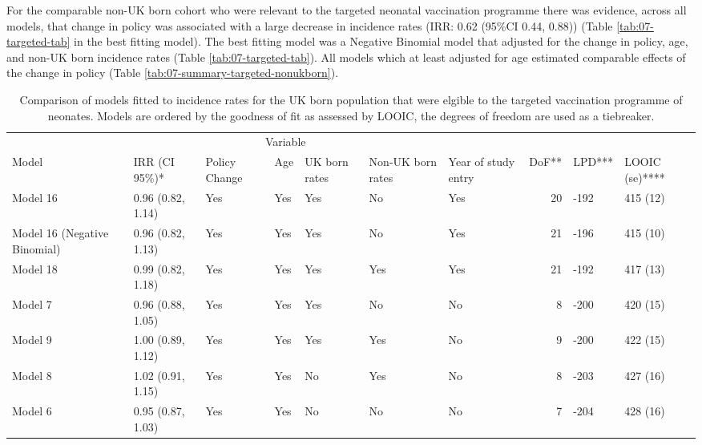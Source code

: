 \documentclass[11pt,twoside]{bristolthesis}
\begin{document}
  For the comparable non-UK born cohort who were relevant to the targeted neonatal vaccination programme there was evidence, across all models, that change in policy was associated with a large decrease in incidence rates (IRR: 0.62 (95\%CI 0.44, 0.88)) (Table \ref{tab:07-targeted-tab} in the best fitting model). The best fitting model was a Negative Binomial model that adjusted for the change in policy, age, and non-UK born incidence rates (Table \ref{tab:07-targeted-tab}). All models which at least adjusted for age estimated comparable effects of the change in policy (Table \ref{tab:07-summary-targeted-nonukborn}).
  \begin{landscape}\begin{table}[!h]
  
  \caption[Comparison of models fitted to incidence rates for the UK born population that were elgible to the targeted vaccination programme of neonates.]{\label{tab:07-summary-targeted-ukborn}Comparison of models fitted to incidence rates for the UK born population that were elgible to the targeted vaccination programme of neonates. Models are ordered by the goodness of fit as assessed by LOOIC, the degrees of freedom are used as a tiebreaker.}
  \centering
  \fontsize{8}{10}\selectfont
  \begin{tabular}{>{\raggedright\arraybackslash}p{3cm}llllllrll}
  \toprule
  \multicolumn{2}{c}{ } & \multicolumn{5}{c}{Variable} & \multicolumn{3}{c}{ } \\
  \cmidrule(l{3pt}r{3pt}){3-7}
  Model & IRR (CI 95\%)* & Policy Change & Age & UK born rates & Non-UK born rates & Year of study entry & DoF** & LPD*** & LOOIC (se)****\\
  \midrule
  Model 16 & 0.96 (0.82, 1.14) & Yes & Yes & Yes & No & Yes & 20 & -192 & 415 (12)\\
  Model 16 (Negative Binomial) & 0.96 (0.82, 1.13) & Yes & Yes & Yes & No & Yes & 21 & -196 & 415 (10)\\
  Model 18 & 0.99 (0.82, 1.18) & Yes & Yes & Yes & Yes & Yes & 21 & -192 & 417 (13)\\
  Model 7 & 0.96 (0.88, 1.05) & Yes & Yes & Yes & No & No & 8 & -200 & 420 (15)\\
  Model 9 & 1.00 (0.89, 1.12) & Yes & Yes & Yes & Yes & No & 9 & -200 & 422 (15)\\
  \addlinespace
  Model 8 & 1.02 (0.91, 1.15) & Yes & Yes & No & Yes & No & 8 & -203 & 427 (16)\\
  Model 6 & 0.95 (0.87, 1.03) & Yes & Yes & No & No & No & 7 & -204 & 428 (16)\\

\end{tabular}
\end{table}
\end{landscape}
\end{document}
